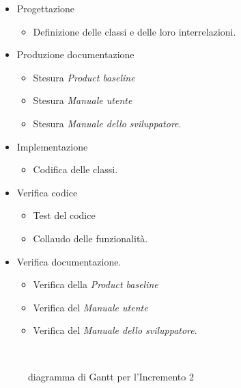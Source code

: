 \documentclass[../piano-di-progetto.tex]{subfiles}
\begin{document}
\begin{itemize}
  \item Progettazione
  \begin{itemize}
    \item Definizione delle classi e delle loro interrelazioni.
  \end{itemize}
  \item Produzione documentazione
  \begin{itemize}
    \item Stesura \textit{Product baseline}
    \item Stesura \textit{Manuale utente}
    \item Stesura \textit{Manuale dello sviluppatore}.
  \end{itemize}
  \item Implementazione
  \begin{itemize}
    \item Codifica delle classi.
  \end{itemize}
  \item Verifica codice
  \begin{itemize}
    \item Test del codice
    \item Collaudo delle funzionalità.
  \end{itemize}
  \item Verifica documentazione.
  \begin{itemize}
    \item Verifica della \textit{Product baseline}
    \item Verifica del \textit{Manuale utente}
    \item Verifica del \textit{Manuale dello sviluppatore}.
  \end{itemize}
\end{itemize}
\begin{figure}[H]
  \centering
  
  \caption{diagramma di Gantt per l'Incremento 2}%
~~\label{fig:gantt_incremento_2}
\end{figure}
\end{document}
